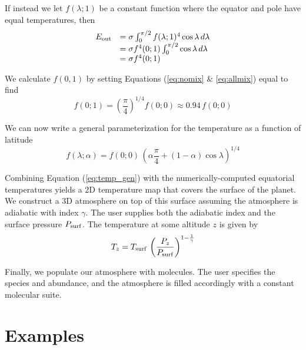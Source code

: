 \documentclass[linenumbers,5p,twocolumn,authoryear]{elsarticle}
\begin{document}
If instead we let $f(\lambda;1)$ be a constant function where the equator and pole have equal temperatures, then
\begin{equation}
    \label{eq:allmix}
    \begin{array}{cl}
        E_{\rm out} & = \sigma \int_0^{\pi/2} f(\lambda;1)^4 \cos{\lambda}\,d\lambda \\
        & = \sigma f^4(0;1) \int_0^{\pi/2} \cos{\lambda}\,d\lambda \\
        & = \sigma f^4(0;1)
    \end{array}
\end{equation}

We calculate $f(0,1)$ by setting Equations (\ref{eq:nomix} \& \ref{eq:allmix}) equal to find
\begin{equation}
    f(0;1) = \left(\frac{\pi}{4}\right)^{1/4} f(0;0) \approx 0.94 \,f(0;0)
\end{equation}

We can now write a general parameterization for the temperature as a function of latitude
\begin{equation}
    \label{eq:temp_gen}
    f(\lambda;\alpha) = f(0;0)\,\left(\alpha \frac{\pi}{4} + (1-\alpha) \cos{\lambda}\right)^{1/4}
\end{equation}

Combining Equation (\ref{eq:temp_gen}) with the numerically-computed equatorial temperatures yields a 2D temperature map that covers the surface of the planet. We construct a 3D atmosphere on top of this surface assuming the atmosphere is adiabatic with index $\gamma$. The user supplies both the adiabatic index and the surface pressure $P_{\rm surf}$. The temperature at some altitude $z$ is given by
\begin{equation}
    T_z = T_{\rm surf}\,\left( \frac{P_z}{P_{\rm surf}} \right)^{1-\frac{1}{\gamma}}
\end{equation}

Finally, we populate our atmosphere with molecules. The user specifies the species and abundance, and the atmosphere is filled accordingly with a constant molecular suite.

\section{Examples \label{sec:examples}}
\end{document}
